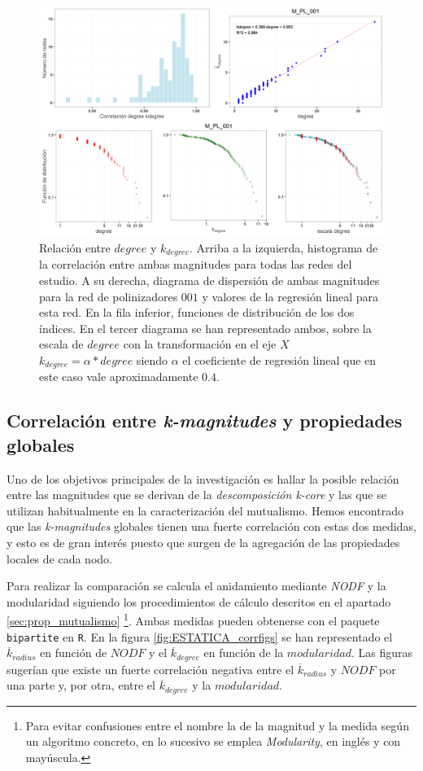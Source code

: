 \begin{figure}[h!]
\centering
\includegraphics[scale=0.5]{Figures/ESTATICA_ALL_plots_kdegree_degree_M_PL_001_ES.png}
\caption{Relación entre $degree$ y $k_{degree}$. Arriba a la izquierda, histograma de la correlación entre ambas magnitudes para todas las redes del estudio. A su derecha, diagrama de dispersión de ambas magnitudes para la red de polinizadores $001$ y valores de la regresión lineal para esta red. En la fila inferior, funciones de distribución de los dos índices. En el tercer diagrama se han representado ambos, sobre la escala de $degree$ con la transformación en el eje $X$ $k_{degree} = \alpha * degree$ siendo $\alpha$ el coeficiente de regresión lineal que en este caso vale aproximadamente $0.4$.}
\label{fig:ESTATICA_ALL_plots_kdegree_degree_M_PL_001_ES}
\end{figure}


\subsection{Correlación entre \textit{k-magnitudes} y propiedades globales}
\label{subsection:Correlacion}

Uno de los objetivos principales de la investigación es hallar la posible relación entre las magnitudes que se derivan de la \textit{descomposición k-core} y las que se utilizan habitualmente en la caracterización del mutualismo. Hemos encontrado que las \textit{k-magnitudes} globales tienen una fuerte correlación con estas dos medidas, y esto es de gran interés puesto que surgen de la agregación de las propiedades locales de cada nodo.

Para realizar la comparación se calcula el anidamiento mediante \textit{NODF} y la modularidad siguiendo los procedimientos de cálculo descritos en el apartado \ref{sec:prop_mutualismo} \footnote{Para evitar confusiones entre el nombre la de la magnitud y la medida según un algoritmo concreto, en lo sucesivo se emplea \textit{Modularity}, en inglés y con mayúscula.}. Ambas medidas pueden obtenerse con el paquete \texttt{bipartite} en \texttt{R}. En la figura \ref{fig:ESTATICA_corrfigs} se han representado el $\overline {k}_{radius}$ en función de $NODF$ y el $\overline {k}_{degree}$ en función de la $modularidad$. Las figuras sugerían que existe un fuerte correlación negativa entre el $\overline {k}_{radius}$ y $NODF$ por una parte y, por otra, entre el $\overline {k}_{degree}$ y la $modularidad$. 

